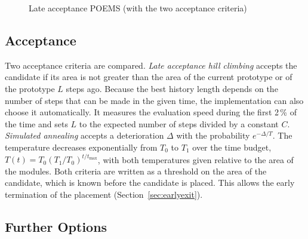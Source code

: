 \begin{figure}
\centering
\begin{algorithmic}[1]
    \STATE{\quad or $\theta \leftarrow A(\beta) - T(t) \ln u$, $u \sim U(0, 1]$ \COMMENT{simulated annealing}}
    \ENDIF
  \ENDFOR
  \RETURN{$\beta^*$}
\end{algorithmic}
\caption{Late acceptance POEMS (with the two acceptance criteria)}
\label{fig:lapoems}
\end{figure}

\subsection{Acceptance}

Two acceptance criteria are compared. {\em Late acceptance hill climbing} \cite{lahc} accepts the candidate if its area is not greater than the area of the current prototype or of the prototype $L$ steps ago. Because the best history length depends on the number of steps that can be made in the given time, the implementation can also choose it automatically. It measures the evaluation speed during the first 2\,\% of the time and sets $L$ to the expected number of steps divided by a constant $C$. {\em Simulated annealing} \cite{sa} accepts a deterioration $\Delta$ with the probability $e^{-\Delta/T}$. The temperature decreases exponentially from $T_0$ to $T_1$ over the time budget, $T(t) = T_0 (T_1/T_0)^{t/t_{\max}}$, with both temperatures given relative to the area of the modules. Both criteria are written as a threshold on the area of the candidate, which is known before the candidate is placed. This allows the early termination of the placement (Section~\ref{sec:earlyexit}).

\subsection{Further Options}

